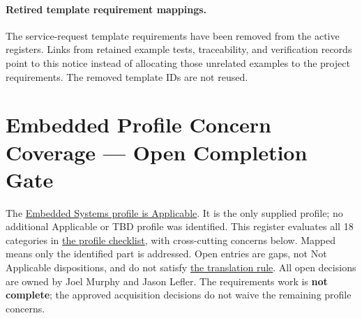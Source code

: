 \paragraph{Retired template requirement mappings.}
\label{Section:RetiredTemplateRequirements}
The service-request template requirements have been removed from the active
registers. Links from retained example tests, traceability, and verification
records point to this notice instead of allocating those unrelated examples
to the project requirements. The removed template IDs are not reused.

\section{Embedded Profile Concern Coverage --- Open Completion Gate}
\label{Section:ProjectProfileConcernCoverage}
The \hyperref[Table:ProjectDomainProfiles]{Embedded Systems profile is Applicable}.
It is the only supplied profile; no additional Applicable or TBD profile was
identified. This register evaluates all 18 categories in
\hyperref[Table:EmbeddedRequirementCategories]{the profile checklist}, with
cross-cutting concerns below. Mapped means only the identified part is
addressed. Open entries are gaps, not Not Applicable dispositions, and do
not satisfy \hyperref[Section:DomainProfileRequirements]{the translation rule}.
All open decisions are owned by Joel Murphy and Jason Lefler. The requirements work is
\textbf{not complete}; the approved acquisition decisions do not waive the
remaining profile concerns.
\small
